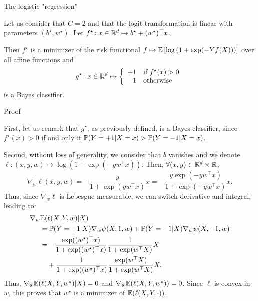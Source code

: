\documentclass[xcolor={usenames,dvipsnames},handout]{beamer}
\begin{document}
\begin{frame}{The logistic "regression"}
\begin{theorem}
	Let us consider that $C=2$ and that the logit-transformation is linear with parameters $(b^\star, w^\star)$.
	Let $f^\star \colon x \in \R^d \mapsto b^\star + (w^\star) ^\top x$.

	Then $f^\star$ is a minimizer of the risk functional
	$f \mapsto \E \left[\log\left( 1 + \exp(-Yf(X)) \right) \right]$ over all affine functions and
	$$
		g^\star \colon x \in \R^d \mapsto
		\left\{ \begin{array}{ll}
			+1 & \text{if } f^\star(x) > 0 \\
			-1 & \text{otherwise}
		\end{array} \right.
	$$
	is a Bayes classifier.
\end{theorem}
\end{frame}

\begin{frame}[allowframebreaks]{Proof}

	First, let us remark that $g^\star$, as previously defined, is a Bayes classifier, since $f^\star(x) > 0$ if and only if $\P(Y=+1 | X=x) > \P(Y=-1 | X=x)$.

	Second, without loss of generality, we consider that $b$ vanishes and we denote $\ell \colon (x, y, w) \mapsto \log\left( 1 + \exp(-y w^\top x) \right)$.
	Then, $\forall (x, y) \in \R^d \times \R$,
	$$
		\nabla_{w}{\ell}(x, y, w)
		= - \frac{y}{1+\exp(y w^\top x)} x
		= - \frac{y \exp(-y w^\top x)}{1+\exp(-y w^\top x)} x.
	$$
	Thus, since $\nabla_{w}{\ell}$ is Lebesgue-measurable, we can switch derivative and integral, leading to:
	\begin{align*}
		\nabla_w & {\E(\ell(X, Y, w)|X)}\\
		&= \P(Y=+1 | X) \nabla_w{\psi}(X, 1, w) + \P(Y=-1 | X) \nabla_w{\psi}(X, -1, w) \\
		&= - \frac{\exp((w^\star)^\top x)}{1+\exp((w^\star)^\top x)} \frac{1}{1+\exp(w^\top X)} X \\
		&\quad +
		\frac{1}{1+\exp((w^\star)^\top x)} \frac{\exp(w^\top X)}{1+\exp(w^\top X)} X.
	\end{align*}
	Thus, $\nabla_{w}{\E(\ell(X, Y, w^\star)|X)} = 0$ and $\nabla_{w}{\E(\ell(X, Y, w^\star))} = 0$.
	Since $\ell$ is convex in $w$, this proves that $w^\star$ is a minimizer of $\E(\ell(X, Y, \cdot))$.
\end{frame}
\end{document}
